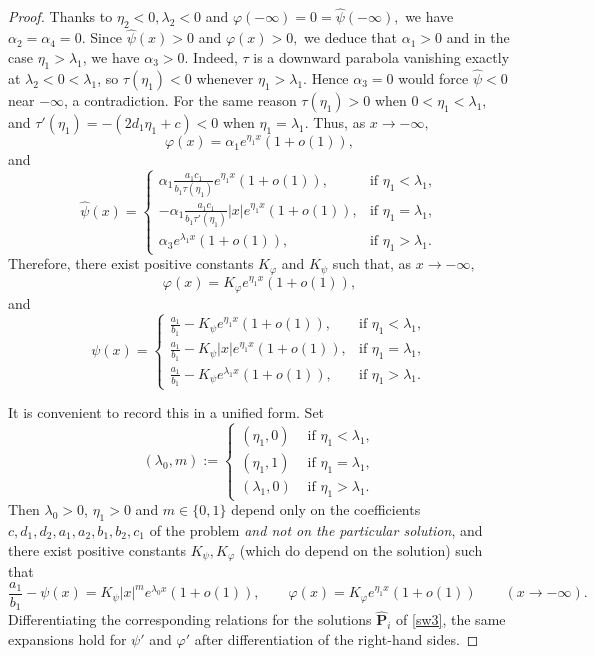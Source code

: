 \documentclass[reqno]{amsart}
\newcommand{\rev}[1]{#1}
\theoremstyle{plain}
\theoremstyle{definition}
\theoremstyle{remark}
\begin{document}
\begin{proof}
		Thanks to \(\eta_2 <0, \lambda_2 <0\) and \(\varphi(-\infty) = 0 = \hat\psi(-\infty),\) we have \(\alpha_2 = \alpha_4 = 0.\) Since \(\hat\psi(x) >0\) and \(\varphi(x)>0,\) we deduce that \(\alpha_1 > 0\) and in the case \(\eta_1 > \lambda_1\), we have \(\alpha_3 > 0.\) \rev{Indeed, $\tau$ is a downward parabola vanishing exactly at $\lambda_2<0<\lambda_1$, so $\tau(\eta_1)<0$ whenever $\eta_1>\lambda_1$. Hence $\alpha_3=0$ would force $\hat\psi<0$ near $-\infty$, a contradiction. For the same reason $\tau(\eta_1)>0$ when $0<\eta_1<\lambda_1$, and $\tau'(\eta_1)=-(2d_1\eta_1+c)<0$ when $\eta_1=\lambda_1$.} Thus, as \(x \to -\infty,\)
		\[
		\varphi(x) = \alpha_1 e^{\eta_1x}(1 + o(1)),        
		\]
		and
		\[
		\hat\psi(x) = \begin{cases}
			\alpha_1 \frac{a_1c_1}{b_1\tau(\eta_1)} e^{\eta_1x} (1 + o(1)), & \text{if } \eta_1 < \lambda_1,\\
			\rev{-}\alpha_1\frac{a_1c_1}{b_1\tau'(\eta_1)}\rev{|x|}e^{\eta_1x} (1 + o(1)),& \text{if } \eta_1 = \lambda_1,\\
			\alpha_3e^{\lambda_1x} (1 + o(1)), & \text{if } \eta_1 > \lambda_1.
		\end{cases}
		\]        
		Therefore, there exist positive constants \(K_\varphi\) and \(K_\psi\) such that, as \(x \to -\infty,\)
		\[
		\varphi(x) = K_\varphi e^{\eta_1 x}(1 + o(1)),
		\]
		and
		\[
		\psi(x) = \begin{cases}
			\frac{a_1}{b_1} - K_\psi  e^{\eta_1x} (1 + o(1)), & \text{if } \eta_1 < \lambda_1,\\
			\frac{a_1}{b_1} - K_\psi \rev{|x|}e^{\eta_1x} (1 + o(1)),& \text{if } \eta_1 = \lambda_1,\\
			\frac{a_1}{b_1} - K_\psi e^{\lambda_1x} (1 + o(1)), & \text{if } \eta_1 > \lambda_1.
		\end{cases}
		\]
		

		\rev{It is convenient to record this in a unified form. Set
		\[
		(\lambda_0,m):=
		\begin{cases}
			(\eta_1,0) & \text{ if } \eta_1<\lambda_1,\\
			(\eta_1,1) & \text{ if } \eta_1=\lambda_1,\\
			(\lambda_1,0) & \text{ if } \eta_1>\lambda_1 .
		\end{cases}
		\]
		Then $\lambda_0>0$, $\eta_1>0$ and $m\in\{0,1\}$ depend only on the
		coefficients $c,d_1,d_2,a_1,a_2,b_1,b_2,c_1$ of the problem \emph{and not on
		the particular solution}, and there exist positive constants
		$K_\psi,K_\varphi$ (which do depend on the solution) such that
		\begin{equation}\label{asym-unified}
			\frac{a_1}{b_1}-\psi(x)=K_\psi|x|^{m}e^{\lambda_0x}(1+o(1)),
			\qquad
			\varphi(x)=K_\varphi e^{\eta_1x}(1+o(1))
			\qquad (x\to-\infty).
		\end{equation}
		Differentiating the corresponding relations for the solutions
		$\hat{\mathbf P}_i$ of \eqref{sw3}, the same expansions hold for
		$\psi'$ and $\varphi'$ after differentiation of the right-hand sides.}


\end{proof}
\end{document}
